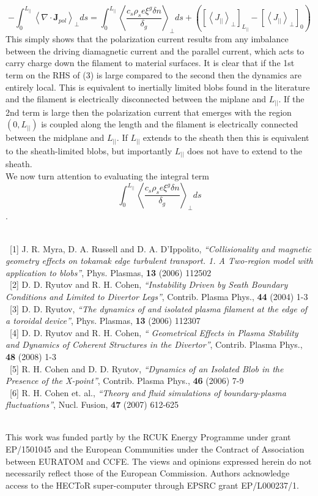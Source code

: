 \documentclass[12pt]{article}
\begin{document}
\begin{equation}
-\int_{0}^{L_{||}}\left<\nabla\cdot\textbf{J}_{pol}\right>_{\perp}ds = \int_{0}^{L_{||}}\left< \frac{c_{s}\rho_{s}e\xi^{g}\delta n}{\delta_{g}}\right>_{\perp}ds + \left(\left[\left<J_{||}\right>_{\perp}\right]_{L_{||}} - \left[\left<J_{||}\right>_{\perp}\right]_{0}\right)
\end{equation}
This simply shows that the polarization current results from any imbalance between the driving diamagnetic current and the parallel current, which acts to carry charge down the filament to material surfaces. It is clear that if the 1st term on the RHS of (3) is large compared to the second then the dynamics are entirely local. This is equivalent to inertially limited blobs found in the literature and the filament is electrically disconnected between the miplane and $L_{||}$. If the 2nd term is large then the polarization current that emerges with the region $(0,L_{||})$ is coupled along the length and the filament is electrically connected between the midplane and  $L_{||}$. If $L_{||}$ extends to the sheath then this is equivalent to the sheath-limited blobs, but importantly $L_{||}$ does not have to extend to the sheath. 
~\\ We now turn attention to evaluating the integral term 
\[\int_{0}^{L_{||}}\left< \frac{c_{s}\rho_{s}e\xi^{g}\delta n}{\delta_{g}}\right>_{\perp}ds\].





~\\ ~[1] J. R. Myra, D. A. Russell and D. A. D'Ippolito, \emph{``Collisionality and magnetic geometry effects on tokamak edge turbulent transport. 1. A Two-region model with application to blobs''}, Phys. Plasmas, {\bfseries 13} (2006) 112502
\\ ~[2] D. D. Ryutov and R. H. Cohen, \emph{``Instability Driven by Seath Boundary Conditions and Limited to Divertor Legs''}, Contrib. Plasma Phys., {\bfseries 44} (2004) 1-3
\\ ~[3] D. D. Ryutov, \emph {``The dynamics of and isolated plasma filament at the edge of a toroidal device''}, Phys. Plasmas, {\bfseries 13} (2006) 112307
\\ ~[4] D. D. Ryutov and R. H. Cohen, \emph{`` Geometrical Effects in Plasma Stability and Dynamics of Coherent Structures in the Divertor''}, Contrib. Plasma Phys., {\bfseries 48} (2008) 1-3
\\ ~[5] R. H. Cohen and D. D. Ryutov, \emph{``Dynamics of an Isolated Blob in the Presence of the X-point''}, Contrib. Plasma Phys., {\bfseries 46} (2006) 7-9
\\ ~[6] R. H. Cohen et. al., \emph{``Theory and fluid simulations of boundary-plasma fluctuations''}, Nucl. Fusion, {\bfseries 47} (2007) 612-625 


~\\{\small  This work was funded partly by the RCUK Energy Programme under grant EP/1501045 and the European Communities under the Contract of Association between EURATOM and CCFE. The views and opinions expressed herein do not necessarily reflect those of the European Commission. Authors acknowledge access to the HECToR super-computer through EPSRC grant EP/L000237/1.}
\end{document}

